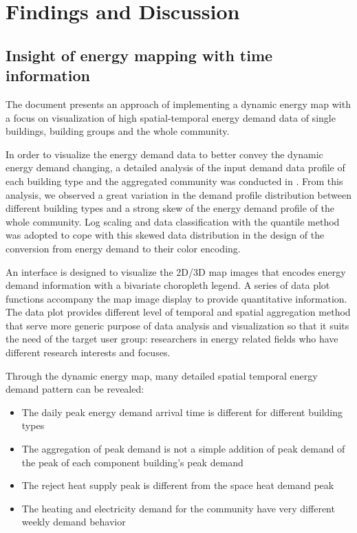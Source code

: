 
\chapter{Findings and Discussion} %

\label{Chapter7} %


\section{Insight of energy mapping with time information}
The document presents an approach of implementing a dynamic energy map
with a focus on visualization of high spatial-temporal energy demand
data of single buildings, building groups and the whole
community. 

In order to visualize the energy demand data to better convey the
dynamic energy demand changing, a detailed analysis of the input
demand data profile of each building type and the aggregated community
was conducted in . From this analysis, we observed a
great variation in the demand profile distribution between different
building types and a strong skew of the energy demand profile of the
whole community. Log scaling and data classification with the quantile
method was adopted to cope with this skewed data distribution in the
design of the conversion from energy demand to their color encoding.

An interface is designed to visualize the 2D/3D map images that
encodes energy demand information with a bivariate choropleth
legend. A series of data plot functions accompany the map image
display to provide quantitative information. The data plot provides
different level of temporal and spatial aggregation method that serve
more generic purpose of data analysis and visualization so that it
suits the need of the target user group: researchers in energy related
fields who have different research interests and focuses.

Through the dynamic energy map, many detailed spatial temporal energy
demand pattern can be revealed:
\begin{itemize}
\item The daily peak energy demand arrival time is different for
  different building types
\item The aggregation of peak demand is not a simple addition of peak
  demand of the peak of each component building's peak demand
\item The reject heat supply peak is different from the space heat
  demand peak
\item The heating and electricity demand for the community have very
  different weekly demand behavior
\end{itemize}
